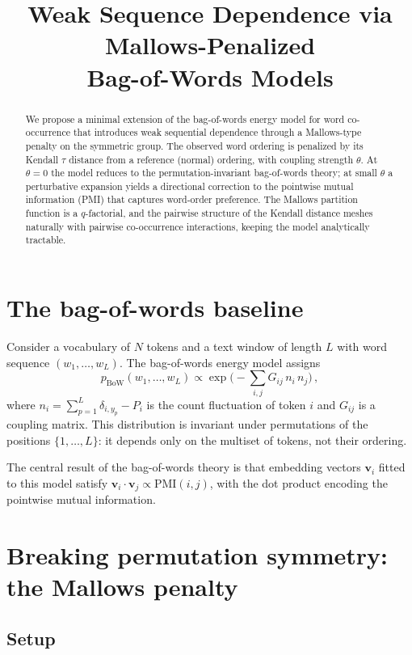 \documentclass[11pt]{article}
\title{Weak Sequence Dependence via Mallows-Penalized\\Bag-of-Words Models}
\author{}
\date{}
\newcommand{\vw}{\bm{v}}
\newcommand{\PMI}{\mathrm{PMI}}
\newcommand{\BoW}{\mathrm{BoW}}
\begin{document}
\maketitle

\begin{abstract}
We propose a minimal extension of the bag-of-words energy model for word co-occurrence that introduces weak sequential dependence through a Mallows-type penalty on the symmetric group. The observed word ordering is penalized by its Kendall $\tau$ distance from a reference (normal) ordering, with coupling strength $\theta$. At $\theta = 0$ the model reduces to the permutation-invariant bag-of-words theory; at small $\theta$ a perturbative expansion yields a directional correction to the pointwise mutual information (PMI) that captures word-order preference. The Mallows partition function is a $q$-factorial, and the pairwise structure of the Kendall distance meshes naturally with pairwise co-occurrence interactions, keeping the model analytically tractable.
\end{abstract}

\section{The bag-of-words baseline}

Consider a vocabulary of $N$ tokens and a text window of length $L$ with word sequence $(w_1, \ldots, w_L)$. The bag-of-words energy model assigns
\begin{equation}\label{eq:bow}
    p_{\BoW}(w_1, \ldots, w_L) \propto \exp\!\Big(-\sum_{i,j} G_{ij}\, n_i\, n_j\Big)\,,
\end{equation}
where $n_i = \sum_{p=1}^{L} \delta_{i,y_p} - P_i$ is the count fluctuation of token $i$ and $G_{ij}$ is a coupling matrix. This distribution is invariant under permutations of the positions $\{1, \ldots, L\}$: it depends only on the multiset of tokens, not their ordering.

The central result of the bag-of-words theory is that embedding vectors $\vw_i$ fitted to this model satisfy $\vw_i \cdot \vw_j \propto \PMI(i,j)$, with the dot product encoding the pointwise mutual information.

\section{Breaking permutation symmetry: the Mallows penalty}

\subsection{Setup}
\end{document}
